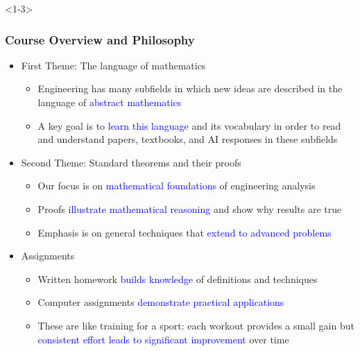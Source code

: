 \documentclass[10pt,english,aspectratio=169]{beamer}
\begin{document}
\begin{frame}<1-3> \frametitle{Course Overview and Philosophy}

\begin{itemize}
\item<1-> First Theme: The language of mathematics \vspace{1mm}

\begin{itemize}
  \setlength\itemsep{1.5mm}
  \item Engineering has many subfields in which new ideas are described in the language of \textcolor{blue}{abstract mathematics}
  
  \item A key goal is to \textcolor{blue}{learn this language} and its vocabulary in order to read \\ and understand papers, textbooks, and AI responses in these subfields \vspace{2mm}
\end{itemize}

\item<2-> Second Theme: Standard theorems and their proofs \vspace{1mm}

\begin{itemize}
  \setlength\itemsep{1.5mm}
  \item Our focus is on \textcolor{blue}{mathematical foundations} of engineering analysis
  \item Proofs \textcolor{blue}{illustrate mathematical reasoning} and show why results are true
  \item Emphasis is on general techniques that \textcolor{blue}{extend to advanced problems}  \vspace{2mm}

\end{itemize}
\item<3->  Assignments \vspace{1mm}

\begin{itemize}
  \setlength\itemsep{2mm}
  \item Written homework \textcolor{blue}{builds knowledge} of definitions and techniques
  \item Computer assignments \textcolor{blue}{demonstrate practical applications}
  \item These are like training for a sport: each workout provides a small gain but \textcolor{blue}{consistent effort leads to significant improvement} over time


\end{itemize}
\end{itemize}
\end{frame}
\end{document}
